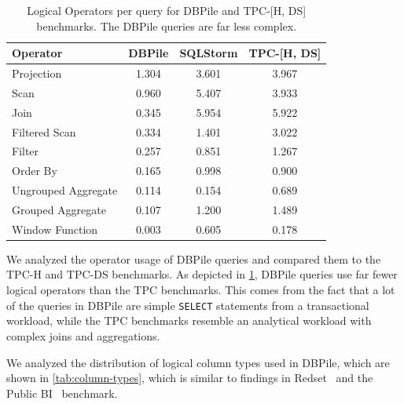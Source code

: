 
\begin{table}
\caption{Logical Operators per query for DBPile and TPC-[H, DS] benchmarks. The DBPile queries are far less complex.}
\label{tab:op-usage}
\begin{tabular}{lccc}
\toprule
\textbf{Operator} & \textbf{DBPile} & \textbf{SQLStorm} & \textbf{TPC-[H, DS]} \\
\midrule
Projection & 1.304 & 3.601 & 3.967 \\
Scan & 0.960 & 5.407 & 3.933 \\
Join & 0.345 & 5.954 & 5.922 \\
Filtered Scan & 0.334 & 1.401 & 3.022 \\
Filter & 0.257 & 0.851 & 1.267 \\
Order By & 0.165 & 0.998 & 0.900 \\
Ungrouped Aggregate & 0.114 & 0.154 & 0.689 \\
Grouped Aggregate & 0.107 & 1.200 & 1.489 \\
Window Function & 0.003 & 0.605 & 0.178 \\
\bottomrule
\end{tabular}
\end{table}


We analyzed the operator usage of DBPile queries and compared them to the TPC-H and TPC-DS benchmarks. As depicted in 
\cref{tab:op-usage}, DBPile queries use far fewer logical operators than the TPC benchmarks.
This comes from the fact that a lot of the queries in DBPile are simple \texttt{SELECT} statements from a transactional workload,
while the TPC benchmarks resemble an analytical workload with complex joins and aggregations.

We analyzed the distribution of logical column types used in DBPile, which are shown in \cref{tab:column-types}, which is 
similar to findings in Redset~\cite{van_renen_why_2024} and the Public BI~\cite{vogelsgesang_get_2018} benchmark.